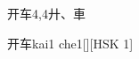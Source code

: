 \begin{entry}{开车}{4,4}{⼶、⾞}
  \begin{phonetics}{开车}{kai1 che1}[][HSK 1]
  \end{phonetics}
\end{entry}

